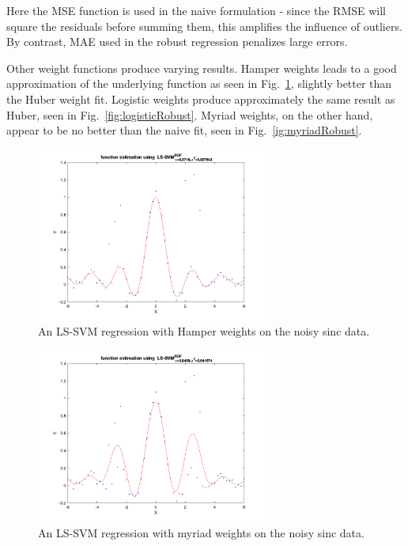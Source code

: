 \documentclass[10pt,a4paper]{article}
\begin{document}
Here the MSE function is used in the naive formulation - since the RMSE will square the residuals before summing them, this amplifies the influence of outliers. By contrast, MAE used in the robust regression penalizes large errors.

Other weight functions produce varying results. Hamper weights leads to a good approximation of the underlying function as seen in Fig.~\ref{fig:hamperRobust}, slightly better than the Huber weight fit. Logistic weights produce approximately the same result as Huber, seen in Fig.~\ref{fig:logisticRobust}. Myriad weights, on the other hand, appear to be no better than the naive fit, seen in Fig.~\ref{ig:myriadRobust}.

\begin{figure}[h!]
\centering
  \includegraphics[width=3in]{robustHamper.png}
  \caption{An LS-SVM regression with Hamper weights on the noisy sinc data.}
  \label{fig:hamperRobust}
\end{figure}

\begin{figure}[h!]
\centering
  \includegraphics[width=3in]{robustMyriad.png}
  \caption{An LS-SVM regression with myriad weights on the noisy sinc data.}
  \label{fig:myriadRobust}
\end{figure}
\end{document}
